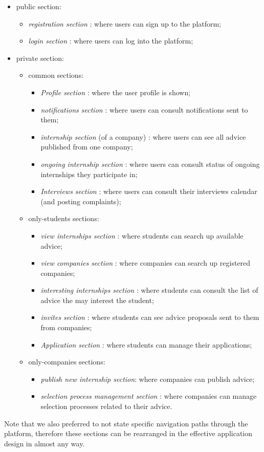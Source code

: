 		\begin{itemize}
			\item public section:
			\begin{itemize}
				\item \emph{registration section} : where users can sign up to the platform;
				\item \emph{login section} : where users can log into the platform;
			\end{itemize}
			\item private section:
			\begin{itemize}
				\item common sections:
				\begin{itemize}
					\item \emph{Profile section} : where the user profile is shown;
					\item \emph{notifications section} : where users can consult notifications sent to them;
					\item \emph{internship section} (of a company) : where users can see all advice published from one company;
					\item \emph{ongoing internship section} : where users can consult status of ongoing internships they participate in;
					\item \emph{Interviews section} : where users can consult their interviews calendar (and posting complaints);
				\end{itemize}
				\item only-students sections:
				\begin{itemize}
					\item \emph{view internships section} : where students can search up available advice;
					\item \emph{view companies section} : where companies can search up registered companies;
					\item \emph{interesting internships section} : where students can consult the list of advice the may interest the student;
					\item \emph{invites section} : where students can see advice proposals sent to them from companies;
					\item \emph{Application section} : where students can manage their applications;
				\end{itemize}
				\item only-companies sections:
				\begin{itemize}
					\item \emph{publish new internship section}: where companies can publish advice;
					\item \emph{selection process management section} : where companies can manage selection processes related to their advice.
				\end{itemize}
			\end{itemize}
		\end{itemize}
		Note that we also preferred to not state specific navigation paths through the platform, therefore these sections can be rearranged in the effective application design in almost any way.
